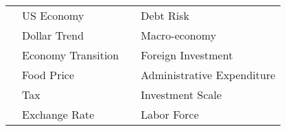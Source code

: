 \documentclass[10pt]{article}
\begin{document}
\begin{table}[ht!]
\begin{center}
\begin{tabular}{cp{5.5cm}|cp{5.5cm}}
	&	US Economy	                                                            &		&	Debt Risk	\\
    &	Dollar Trend	                                                           &		&	Macro-economy 	\\
	&	Economy Transition                                                     &		&	Foreign Investment	\\
	&	Food Price	                                                            &		&	Administrative Expenditure	\\
	&	Tax	                                                                            &		&	Investment Scale	\\
	&	Exchange Rate	                                                            &		&	Labor Force	\\
\hline							
	
	\end{tabular}
	\end{center}
	
	\end{table}
	
\end{document}
